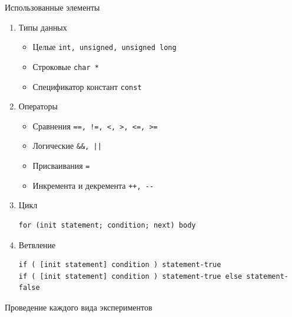 \documentclass[unknownkeysallowed]{beamer}
\begin{document}
\begin{frame}[fragile]{Использованные элементы}

\begin{enumerate}

\item Типы данных

\begin{itemize}
  \item Целые \lstinline[basicstyle=\ttfamily\small]{int, unsigned, unsigned long}
  \item Строковые \lstinline[basicstyle=\ttfamily\small]{char *}
  \item Спецификатор констант \lstinline[basicstyle=\ttfamily\small]{const}
\end{itemize}

\item Операторы

\begin{itemize}
  \item Сравнения \lstinline[basicstyle=\ttfamily\small]{==, !=, <, >, <=, >=}
  \item Логические \lstinline[basicstyle=\ttfamily\small]{&&, ||}
  \item Присваивания \lstinline[basicstyle=\ttfamily\small]{=}
  \item Инкремента и декремента \lstinline[basicstyle=\ttfamily\small]{++, --}
\end{itemize}

\item Цикл
\begin{lstlisting}[basicstyle=\ttfamily\small]
for (init statement; condition; next) body
\end{lstlisting}

\item Ветвление
\begin{lstlisting}[basicstyle=\ttfamily\small]
if ( [init statement] condition ) statement-true
if ( [init statement] condition ) statement-true else statement-false
\end{lstlisting}

\end{enumerate}

\end{frame}

\begin{frame}[fragile]{Проведение каждого вида экспериментов}




\end{frame}
\end{document}
